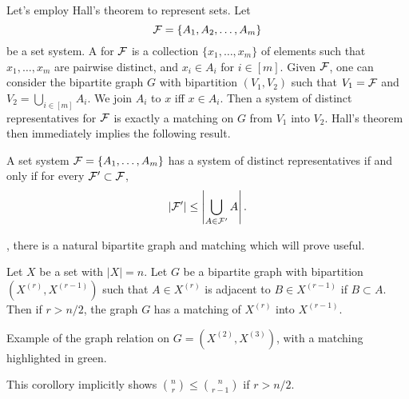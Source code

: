Let's employ Hall's theorem to represent sets. Let 
\[
 \mathcal{F} = \{A_1,A_2,\dotsc,A_m\}
 \] be a set system.
A  for $\mathcal{F}$ is a collection $\{x_1,\dotsc,x_m\}$ of elements such that $x_1,\dotsc, x_m$ are pairwise distinct, and $x_i \in A_i$ for $i\in[m]$.
Given $\mathcal{F}$, one can consider the bipartite graph $G$ with bipartition $(V_1,V_2)$ such that $V_1 = \mathcal{F}$ and $V_2= \bigcup_{i\in[m]} A_i$. We join $A_i$ to $x$ iff $x\in A_i$.
Then a system of distinct representatives for $\mathcal{F}$ is exactly a matching on $G$ from $V_1$ into $V_2$. Hall's theorem then immediately implies the following result.
\begin{corollary}
A set system $\mathcal{F} = \{A_1,\dotsc,A_m\}$ has a system of distinct representatives if and only if for every $\mathcal{F}'\subset \mathcal{F}$, 
\[
|\mathcal{F}'| \leq \left|\bigcup_{A\in \mathcal{F}'}A\right|.
\]
\end{corollary}
, there is a natural bipartite graph and matching which will prove useful.
\begin{corollary} \label{cor:Xr_matching_exists}
Let $X$ be a set with $|X|=n$. Let $G$ be a bipartite graph with bipartition $(X^{(r)}, X^{(r-1)})$ such that $A\in X^{(r)}$ is adjacent to $B \in X^{(r-1)}$ if $B\subset A$. Then if  $r> n/2$, the graph $G$ has a matching of $X^{(r)}$ into $X^{(r-1)}$.
\begin{marginfigure}
\begin{center}
\end{center}
\caption{Example of the graph relation on $G= (X^{(2)}, X^{(3)})$, with a matching highlighted in green.}
\end{marginfigure}
\end{corollary}
\begin{remark}
This corollory implicitly shows ${n \choose r} \leq {n \choose r-1}$ if $r> n/2$.
\end{remark}
